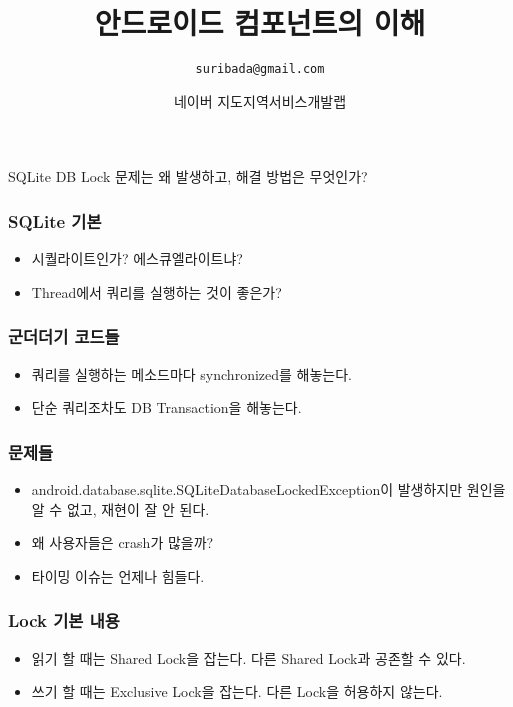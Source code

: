 \documentclass{beamer}
\begin{document}

\title{안드로이드 컴포넌트의 이해}
\author[노재춘]{\texttt{suribada@gmail.com}}
\date[\today]{네이버 지도지역서비스개발랩}

\begin{frame}
\titlepage
\end{frame}

\begin{frame}
SQLite DB Lock 문제는 왜 발생하고, 해결 방법은 무엇인가?
\end{frame}

\begin{frame}
\frametitle{SQLite 기본}
\begin{itemize}
\item 시퀄라이트인가? 에스큐엘라이트냐?
\item Thread에서 쿼리를 실행하는 것이 좋은가?
\end{itemize}
\end{frame}

\begin{frame}
\frametitle{군더더기 코드들}
\begin{itemize}
\item 쿼리를 실행하는 메소드마다 synchronized를 해놓는다.
\item 단순 쿼리조차도 DB Transaction을 해놓는다.
\end{itemize}
\end{frame}

\begin{frame}
\frametitle{문제들}
\begin{itemize}
\item android.database.sqlite.SQLiteDatabaseLockedException이 발생하지만 원인을 알 수 없고, 재현이 잘 안 된다.
\item 왜 사용자들은 crash가 많을까?
\item 타이밍 이슈는 언제나 힘들다.
\end{itemize}
\end{frame}

\begin{frame}
\frametitle{Lock 기본 내용}
\begin{itemize}
\item 읽기 할 때는 Shared Lock을 잡는다. 다른 Shared Lock과 공존할 수 있다.
\item 쓰기 할 때는 Exclusive Lock을 잡는다. 다른 Lock을 허용하지 않는다.
\end{itemize}
\end{frame}
\end{document}

